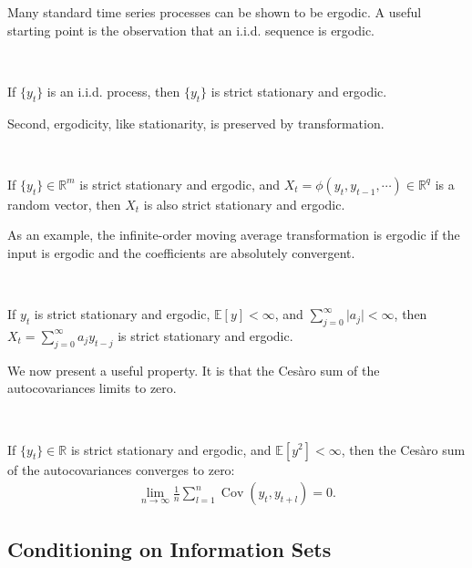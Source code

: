 Many standard time series processes can be shown to be ergodic.
A useful starting point is the observation that an i.i.d. sequence is ergodic. 

\begin{theorem}\label{thm:iid-ergodic}
    \

    If $\{y_t\}$ is an i.i.d. process, then $\{y_t\}$ is strict stationary and ergodic.    
\end{theorem}

Second, ergodicity, like stationarity, is preserved by transformation.
\begin{theorem}\label{thm:ergodicity-transformation-invariance}
    \

    If $\{y_t\} \in \mathbb{R}^m$ is strict stationary and ergodic,
    and $X_t = \phi (y_t, y_{t-1}, \cdots) \in \mathbb{R}^q$ is a random vector,
    then $X_t$ is also strict stationary and ergodic.
\end{theorem}

As an example, the infinite-order moving average transformation is ergodic
if the input is ergodic and the coefficients are absolutely convergent.

\begin{theorem}
    \

    If $y_t$ is strict stationary and ergodic, $\mathbb{E}[y] < \infty$,
    and $\sum_{j=0}^{\infty} \vert a_j \vert < \infty$,
    then $X_t = \sum_{j=0}^{\infty} a_j y_{t-j}$ is strict stationary and ergodic.    
\end{theorem}

We now present a useful property. It is that the Cesàro sum of the autocovariances limits to zero.

\begin{theorem}\label{thm:cesaro-sum-autocovariances}
    \

    If $\{y_t\} \in \mathbb{R}$ is strict stationary and ergodic, and $\mathbb{E}[y^2] < \infty$,
    then the Cesàro sum of the autocovariances converges to zero:
    \begin{gather*}
        \lim_{n \to \infty} \frac{1}{n} \sum_{l=1}^{n} \operatorname{Cov}(y_t, y_{t+l}) = 0.
    \end{gather*}    
\end{theorem}

\subsection{Conditioning on Information Sets}


